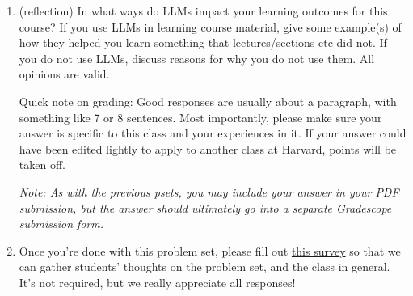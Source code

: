 \documentclass[11pt]{report}
\begin{document}
\begin{enumerate}
\begin{itemize}
\end{itemize}

\item (reflection) In what ways do LLMs impact your learning outcomes for this course? If you use LLMs in learning course material, give some example(s) of how they helped you learn something that lectures/sections etc did not. If you do not use LLMs, discuss reasons for why you do not use them. All opinions are valid.

Quick note on grading: Good responses are usually about a paragraph, with something like 7 or 8 sentences. Most importantly, please make sure your answer is specific to this class and your experiences in it. If your answer could have been edited lightly to apply to another class at Harvard, points will be taken off.

\textit{Note: As with the previous psets, you may include your answer in your PDF submission, but the answer should ultimately go into a separate Gradescope submission form.}

\item Once you're done with this problem set, please fill out \href{https://forms.gle/7U7bXytpVMCRzbZ8A}{this survey} so that we can gather students' thoughts on the problem set, and the class in general. It's not required, but we really appreciate all responses!

\end{enumerate}
\end{document}
